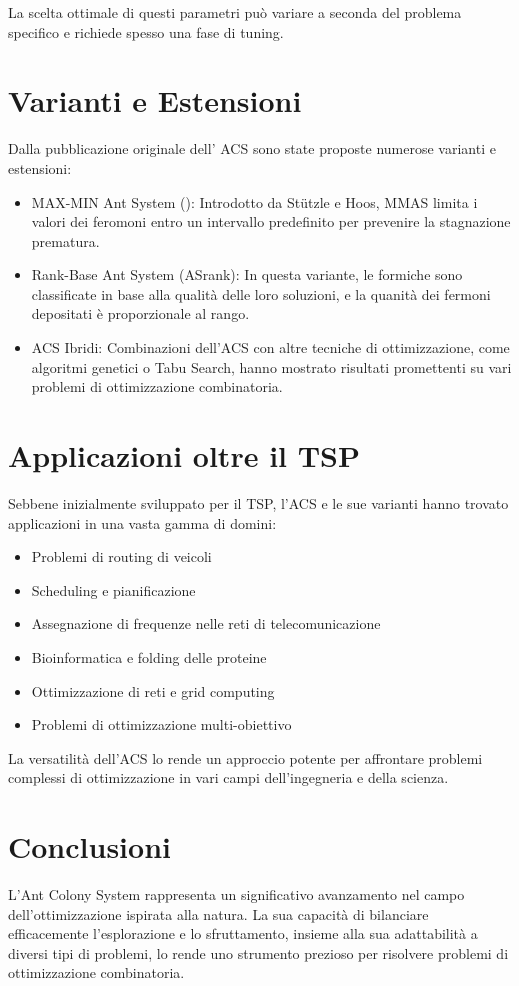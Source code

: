La scelta ottimale di questi parametri può variare a seconda del problema specifico e richiede spesso una fase di tuning.

\section{Varianti e Estensioni}

Dalla pubblicazione originale dell' \gls{ACS} sono state proposte numerose varianti e estensioni:
\begin{itemize}
  \item MAX-MIN Ant System (): Introdotto da Stützle e Hoos, \gls{MMAS} limita i valori dei feromoni entro un intervallo predefinito per prevenire la stagnazione prematura. \cite{Stuetzle1997}
  \item Rank-Base Ant System (\gls{ASrank}): In questa variante, le formiche sono classificate in base alla qualità delle loro soluzioni, e la quanità dei fermoni depositati è proporzionale al rango.
  \item ACS Ibridi: Combinazioni dell'ACS con altre tecniche di ottimizzazione, come algoritmi genetici o Tabu Search, hanno mostrato risultati promettenti su vari problemi di ottimizzazione combinatoria. 
\end{itemize}

\section{Applicazioni oltre il \gls{TSP}}

Sebbene inizialmente sviluppato per il \gls{TSP}, l'\gls{ACS} e le sue varianti hanno trovato applicazioni in una vasta gamma di domini:

\begin{itemize}
	\item Problemi di routing di veicoli
	\item Scheduling e pianificazione
	\item Assegnazione di frequenze nelle reti di telecomunicazione
	\item Bioinformatica e folding delle proteine
	\item Ottimizzazione di reti e grid computing
	\item Problemi di ottimizzazione multi-obiettivo
\end{itemize}

La versatilità dell'\gls{ACS} lo rende un approccio potente per affrontare problemi complessi di ottimizzazione in vari campi dell'ingegneria e della scienza.

\section{Conclusioni}

L'Ant Colony System rappresenta un significativo avanzamento nel campo dell'ottimizzazione ispirata alla natura. La sua capacità di bilanciare efficacemente l'esplorazione e lo sfruttamento, insieme alla sua adattabilità a diversi tipi di problemi, lo rende uno strumento prezioso per risolvere problemi di ottimizzazione combinatoria. \cite{Dorigo1997}


